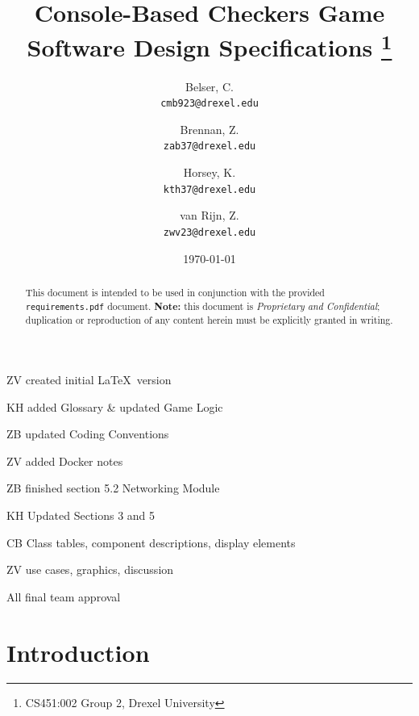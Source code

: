 \documentclass[letterpaper]{article}
\title{
    Console-Based Checkers Game\\
    Software Design Specifications
    \footnote{CS451:002 Group 2, Drexel University}
}
\author{
    Belser, C.\\
    \texttt{cmb923@drexel.edu}
    \and
    Brennan, Z.\\
    \texttt{zab37@drexel.edu}
    \and
    Horsey, K.\\
    \texttt{kth37@drexel.edu}
    \and
    van Rijn, Z.\\
    \texttt{zwv23@drexel.edu}
}
\date{\today}
\begin{document}

\maketitle

\begin{abstract}

This document is intended to be used in conjunction with the
provided \texttt{requirements.pdf} document. \textbf{Note:} this
document is \emph{Proprietary and Confidential}; duplication
or reproduction of any content herein must be explicitly granted
in writing.

\end{abstract}


\tableofcontents
\newpage


\begin{versionhistory}
        {\date{}}
        {ZV}
        {created initial \LaTeX~version}
        {\date{}}
        {KH}
        {added Glossary \& updated Game Logic}
        {\date{}}
        {ZB}
        {updated Coding Conventions}
        {\date{}}
        {ZV}
        {added Docker notes}
        {\date{}}
        {ZB}
        {finished section 5.2 Networking Module}
        {\date{}}
        {KH}
        {Updated Sections 3 and 5}
        {\date{}}
        {CB}
        {Class tables, component descriptions, display
        elements}
        {\date{}}
        {ZV}
        {use cases, graphics, discussion}
        {\date{}}
        {All}
        {final team approval}
\end{versionhistory}
\newpage


\section{Introduction}
\label{sec:intro}
\end{document}
